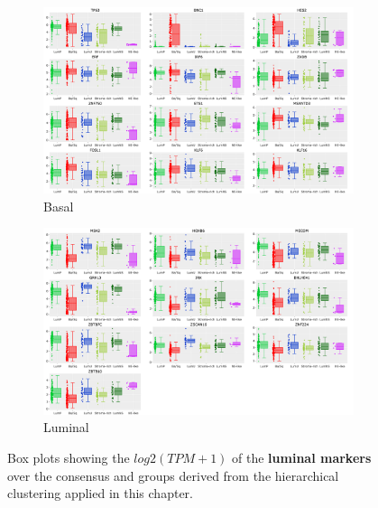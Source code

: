 \begin{figure}[H]
    \captionsetup[subfigure]{justification=Centering}
  \begin{subfigure}[!t]{1.0\textwidth}
    \includegraphics[width=1.0\textwidth,height=1.0\textheight,keepaspectratio]{Sections/Network_I/Resources/selective_pruning/log2_consensus_basal.png}
    \caption{Basal}
    \label{fig:ap:box_basal_consensus}
    \end{subfigure}
  \begin{subfigure}[!t]{1.0\textwidth}
      \includegraphics[width=1.0\textwidth,height=1.0\textheight,keepaspectratio]{Sections/Network_I/Resources/selective_pruning/log2_consensus_lum.png}
      \caption{Luminal}
      \label{fig:ap:box_luminal_consensus}
  \end{subfigure}
  \caption{Box plots showing the $log2(TPM+1)$ of the \textbf{luminal markers} over the consensus and groups derived from the hierarchical clustering applied in this chapter.}
  \label{fig:ap:box_consensus}
\end{figure}



